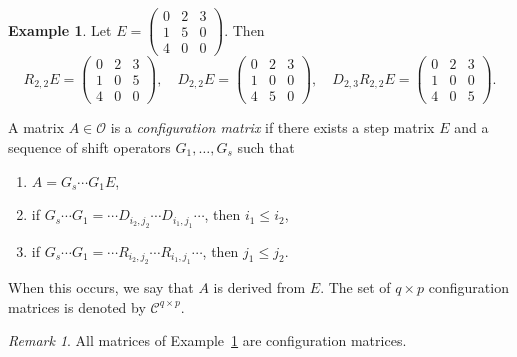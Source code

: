 \documentclass[a4paper,12pt]{amsart}
\renewcommand{\le}{\leqslant}
\theoremstyle{definition}
\newtheorem{example}[formula]{Example}
\theoremstyle{remark}
\newtheorem*{remark}{Remark}
\numberwithin{equation}{section}
\begin{document}
\begin{example}\label{example2}
Let $E = \begin{pmatrix}
0 & 2 & 3 \\
1 & 5 & 0 \\
4 & 0 & 0
\end{pmatrix}$. Then 
\[
 R_{2,2}E = \begin{pmatrix} 
0 & 2 & 3\\
1 & 0 & 5\\
4 & 0 & 0
\end{pmatrix},\quad 
D_{2,2}E = \begin{pmatrix} 
0 & 2 & 3\\
1 & 0 & 0\\
4 & 5 & 0
\end{pmatrix},\quad 
D_{2,3} R_{2,2}E = \begin{pmatrix} 
0 & 2 & 3\\
1 & 0 & 0\\
4 & 0 & 5
\end{pmatrix}.
\]
\end{example}

A matrix $A \in \mathcal{O}$ is a \textit{configuration matrix} if there exists a step matrix $E$ and a sequence of shift operators 
$G_1, \ldots, G_s$ such that
\begin{enumerate}
\item[1)] $A = G_s \cdots G_1 E$,
\item[2)] if $G_s \cdots G_1 = \cdots D_{i_2, j_2} \cdots D_{i_1, j_1} \cdots$, then $i_1 \le i_2$,
\item[3)] if $G_s \cdots G_1 = \cdots R_{i_2, j_2} \cdots R_{i_1, j_1} \cdots$, then $j_1 \le j_2$.
\end{enumerate}
When this occurs, we say that $A$ is derived from $E$.
The set of $q \times p$ configuration matrices is denoted by $\mathcal{C}^{q \times p}$.

\begin{remark}
All matrices of Example~\ref{example2} are configuration matrices.
\end{remark}
\end{document}
